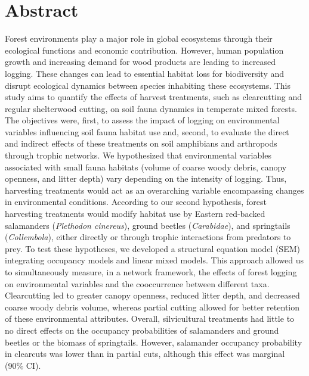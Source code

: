 \chapter*{Abstract}             %
\label{chap-abstract}           %

Forest environments play a major role in global ecosystems through their ecological functions and economic contribution. 
However, human population growth and increasing demand for wood products are leading to increased logging. 
These changes can lead to essential habitat loss for biodiversity and disrupt ecological dynamics between species inhabiting these ecosystems. 
This study aims to quantify the effects of harvest treatments, such as clearcutting and regular shelterwood cutting, on soil fauna dynamics in temperate mixed forests. 
The objectives were, first, to assess the impact of logging on environmental variables influencing soil fauna habitat use and, second, 
to evaluate the direct and indirect effects of these treatments on soil amphibians and arthropods through trophic networks. 
We hypothesized that environmental variables associated with small fauna habitats (volume of coarse woody debris, canopy openness, and litter depth) vary depending on the intensity of logging. 
Thus, harvesting treatments would act as an overarching variable encompassing changes in environmental conditions. 
According to our second hypothesis, forest harvesting treatments would modify habitat use by Eastern red-backed salamanders (\textit{Plethodon cinereus}), ground beetles (\textit{Carabidae}), and springtails (\textit{Collembola}), 
either directly or through trophic interactions from predators to prey. 
To test these hypotheses, we developed a structural equation model (SEM) integrating occupancy models and linear mixed models. 
This approach allowed us to simultaneously measure, in a network framework, the effects of forest logging on environmental variables and the cooccurrence between different taxa. 
Clearcutting led to greater canopy openness, reduced litter depth, and decreased coarse woody debris volume,  
whereas partial cutting allowed for better retention of these environmental attributes. 
Overall, silvicultural treatments had little to no direct effects on the occupancy probabilities of salamanders and ground beetles or the biomass of springtails. 
However, salamander occupancy probability in clearcuts was lower than in partial cuts, although this effect was marginal (90\% CI). 
